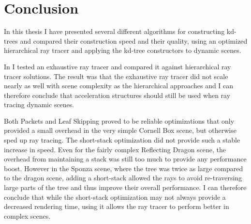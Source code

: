 




\chapter{Conclusion}


In this thesis I have presented several different algorithms for constructing
kd-trees and compared their construction speed and their quality, using an
optimized hierarchical ray tracer and applying the kd-tree constructors to
dynamic scenes.



In  I tested an exhaustive ray tracer and compared it
against hierarchical ray tracer solutions. The result was that the exhaustive
ray tracer did not scale nearly as well with scene complexity as the
hierarchical approaches and I can therefore conclude that acceleration
structures should still be used when ray tracing dynamic scenes.


Both Packets and Leaf Skipping proved to be reliable optimizations that only
provided a small overhead in the very simple Cornell Box scene, but otherwise
sped up ray tracing. The short-stack optimization did not provide such a stable
increase in speed. Even for the fairly complex Reflecting Dragon scene, the
overhead from maintaining a stack was still too much to provide any performance
boost. However in the Sponza scene, where the tree was twice as large compared
to the dragon scene, adding a short-stack allowed the rays to avoid
re-traversing large parts of the tree and thus improve their overall
performance. I can therefore conclude that while the short-stack optimization
may not always provide a decreased rendering time, using it allows the ray
tracer to perform better in complex scenes.


